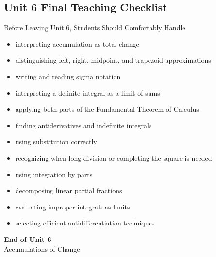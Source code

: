 \documentclass[11pt]{article}
\begin{document}
\newpage
\subsection{Unit 6 Final Teaching Checklist}

\begin{theorybox}{Before Leaving Unit 6, Students Should Comfortably Handle}
\begin{itemize}
    \item interpreting accumulation as total change
    \item distinguishing left, right, midpoint, and trapezoid approximations
    \item writing and reading sigma notation
    \item interpreting a definite integral as a limit of sums
    \item applying both parts of the Fundamental Theorem of Calculus
    \item finding antiderivatives and indefinite integrals
    \item using substitution correctly
    \item recognizing when long division or completing the square is needed
    \item using integration by parts
    \item decomposing linear partial fractions
    \item evaluating improper integrals as limits
    \item selecting efficient antidifferentiation techniques
\end{itemize}
\end{theorybox}

\vfill
\begin{center}
{\Large\color{novelPurpleDark}\textbf{End of Unit 6}}\\[0.35em]
{\large Accumulations of Change}
\end{center}
\end{document}
